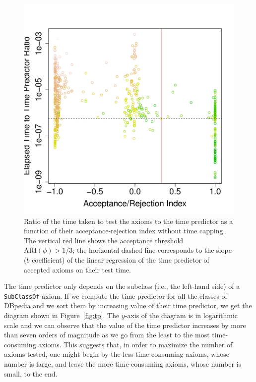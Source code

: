 \documentclass{sig-alternate}
\begin{document}
\begin{figure}[t]
\begin{center}
  \includegraphics[height=\plotheight]{ratio-ARI}
\end{center}
\caption{Ratio of the time taken to test the axioms to the time predictor
  as a function of their acceptance-rejection index without time capping.
  The vertical red line shows the acceptance threshold $\mathrm{ARI}(\phi)>1/3$;
  the horizontal dashed line corresponds to the slope  ($b$ coefficient) of the linear regression of the time predictor of accepted axioms on their test time.}
\label{fig:ratio-ARI}
\end{figure}

The time predictor only depends on the subclass (i.e., the left-hand side)
of a \texttt{SubClassOf} axiom. If we compute the
time predictor for all the classes of DBpedia and we sort them by increasing value
of their time predictor, we get the diagram shown in Figure~\ref{fig:tp}.
The $y$-axis of the diagram is in logarithmic scale and we can observe that
the value of the time predictor increases by more than seven orders of magnitude
as we go from the least to the most time-consuming axioms.
This suggests that, in order to maximize the number of axioms tested,
one might begin by the less time-consuming axioms, whose number is large,
and leave the more time-consuming axioms, whose number is small, to the end.
\end{document}
